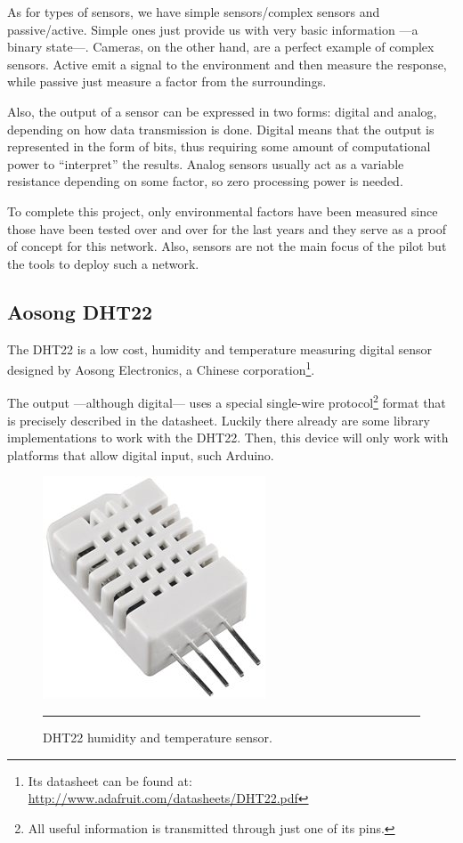 As for types of sensors, we have simple sensors/complex sensors and passive/active. Simple ones just provide us with very basic information ---a binary state---. Cameras, on the other hand, are a perfect example of complex sensors. Active emit a signal to the environment and then measure the response, while passive just measure a factor from the surroundings.

Also, the output of a sensor can be expressed in two forms: digital and analog, depending on how data transmission is done. Digital  means that the output is represented in the form of bits, thus requiring some amount of computational power to ``interpret'' the results. Analog sensors usually act as a variable resistance depending on some factor, so zero processing power is needed.

To complete this project, only environmental factors have been measured since those have been tested over and over for the last years and they serve as a proof of concept for this network. Also, sensors are not the main focus of the pilot but the tools to deploy such a network.

\subsection{Aosong DHT22}
\label{sub:dht}

The DHT22 is a low cost, humidity and temperature measuring digital sensor designed by Aosong Electronics, a Chinese corporation\footnote{Its datasheet can be found at: \url{http://www.adafruit.com/datasheets/DHT22.pdf}}. 

The output ---although digital--- uses a special single-wire protocol\footnote{All useful information is transmitted through just one of its pins.} format that is precisely described in the datasheet. Luckily there already are some library implementations to work with the DHT22. Then, this device will only work with platforms that allow digital input, such Arduino.

\begin{figure}[htbp]
    \centering
        \includegraphics[scale=0.8]{./Figures/dht22.jpg}
        \rule{35em}{0.5pt}
    \caption[DHT22 sensor]{DHT22 humidity and temperature sensor.}
    \label{fig:DHT22}
\end{figure}


